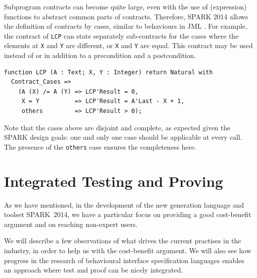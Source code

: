 \documentclass[sttt,final]{svjour}
\newcommand{\newspark}{SPARK~2014\xspace}
\begin{document}
Subprogram contracts can become quite large, even with the use of (expression)
functions to abstract common parts of contracts. Therefore, SPARK 2014 allows
the definition of contracts by cases, similar to behaviours in
JML \cite{JML}. For example, the contract of \verb|LCP| can state separately
sub-contracts for the cases where the elements at \verb|X| and \verb|Y| are
different, or \verb|X| and \verb|Y| are equal. This contract may be used
instead of or in addition to a precondition and a postcondition.

\begin{lstlisting}
function LCP (A : Text; X, Y : Integer) return Natural with
  Contract_Cases =>
    (A (X) /= A (Y) => LCP'Result = 0,
     X = Y          => LCP'Result = A'Last - X + 1,
     others         => LCP'Result > 0);
\end{lstlisting}

Note that the cases above are disjoint and complete, as expected given
the SPARK design goals: one and only one case should be applicable at
every call. The presence of the \verb|others| case ensures the
completeness here.

\section{Integrated Testing and Proving}
\label{hilite}
As we have mentioned, in the development of the new generation
language and toolset \newspark, we have a particular focus on
providing a good cost-benefit argument and on reaching non-expert
users.

We will describe a few observations of what drives the current
practises in the industry, in order to help us with the cost-benefit
argument. We will also see how progress in the research of behavioural
interface specification languages \cite{HatcliffLLMP12} enables an
approach where test and proof can be nicely integrated.
\end{document}
